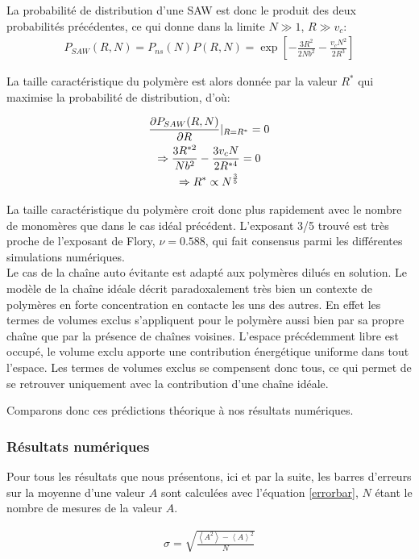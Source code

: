 La probabilité de distribution d'une SAW est donc le produit des deux probabilités précédentes, ce qui donne dans la limite $N \gg 1$, $R \gg v_c$:
\begin{eqnarray}
P_{SAW}(R,N)=P_{ns}(N) P(R,N)=\exp\left[-\frac{3R^2}{2 N b^2}-\frac{v_cN^2}{2R^3}\right]
\end{eqnarray}

La taille caractéristique du polymère est alors donnée par la valeur $R^*$ qui maximise la probabilité de distribution, d'où:

\begin{gather}
\frac{\partial P_{SAW}(R,N)}{\partial R} \Huge{|} _{R=R^*}=0 \nonumber\\
\Rightarrow \frac{3R^{*2}}{Nb^2}-\frac{3v_cN}{2R^{*4}} =0 \\
\Rightarrow R^* \propto N^\frac{3}{5}\nonumber
\end{gather}


La taille caractéristique du polymère croit donc plus rapidement avec le nombre de monomères que dans le cas idéal précédent. L'exposant 3/5 trouvé est très proche de l'exposant de Flory, $\nu=0.588$, qui fait consensus parmi les différentes simulations numériques. \\


Le cas de la chaîne auto évitante est adapté aux polymères dilués en solution. Le modèle de la chaîne idéale décrit paradoxalement très bien un contexte de polymères en forte concentration en contacte les uns des autres. En effet les termes de volumes exclus s'appliquent pour le polymère aussi bien par sa propre chaîne que par la présence de chaînes voisines. L'espace précédemment libre est occupé, le volume exclu apporte une contribution énergétique uniforme dans tout l'espace. Les termes de volumes exclus se compensent donc tous, ce qui permet de se retrouver uniquement avec la contribution d'une chaîne idéale.

Comparons donc ces prédictions théorique à nos résultats numériques.

\subsubsection{Résultats numériques}
Pour tous les résultats que nous présentons, ici et par la suite, les barres d'erreurs sur la moyenne d'une valeur $A$ sont calculées avec l'équation \ref{errorbar}, $N$ étant le nombre de mesures de la valeur $A$.

\begin{eqnarray}
\sigma=\sqrt{\frac{\left<A^2\right>-\left<A\right>^2}{N}}
\label{errorbar}
\end{eqnarray}


